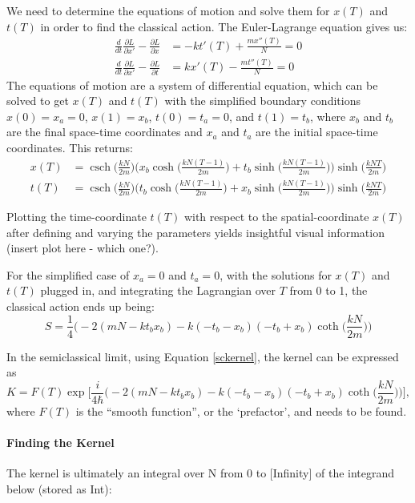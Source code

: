 \documentclass[12pt]{revtex4}
\DeclareMathOperator{\csch}{csch}
\begin{document}
We need to determine the equations of motion and solve them for $x(T)$ and $t(T)$ in order to find the classical action. The Euler-Lagrange equation gives us:
\begin{align*}
\frac{d}{dt}\frac{\partial L}{\partial x'}-\frac{\partial L}{\partial x} &= -k t'(T) + \frac{m x''(T)}{N} =0\\
\frac{d}{dt}\frac{\partial L}{\partial x'}-\frac{\partial L}{\partial t} &= k x'(T) - \frac{m t''(T)}{N} =0
\end{align*}
The equations of motion are a system of differential equation, which can be solved to get $x(T)$ and $t(T)$ with the simplified boundary conditions $x(0) = x_a = 0$, $x(1)=x_b$, $t(0) = t_a = 0$, and $t(1)=t_b$, where $x_b$ and $t_b$ are the final space-time coordinates and $x_a$ and $t_a$ are the initial space-time coordinates. This returns:
\begin{align*}
x(T) &= \csch \bigg(\frac{k N}{2 m}\bigg) \Biggr(x_b \cosh\bigg(\frac{k N (T-1)}{2m}\bigg)+ 
t_b \sinh\bigg(\frac{k N (T-1)}{2m}\bigg)\Biggr) \sinh\bigg(\frac{k N T}{2m}\bigg)\\
t(T)&= \csch \bigg(\frac{k N}{2 m}\bigg) \Biggr(t_b \cosh\bigg(\frac{k N (T-1)}{2m}\bigg)+ 
x_b \sinh\bigg(\frac{k N (T-1)}{2m}\bigg)\Biggr) \sinh\bigg(\frac{k N T}{2m}\bigg)
\end{align*} 

Plotting the time-coordinate $t(T)$ with respect to the spatial-coordinate $x(T)$ after defining and varying the parameters yields insightful visual information (insert plot here - which one?).

For the simplified case of $x_a=0$ and $t_a=0$, with the solutions for $x(T)$ and $t(T)$ plugged in, and integrating the Lagrangian over $T$ from 0 to 1, the classical action ends up being:
\begin{equation*}
S = \frac{1}{4} \Bigg(-2 (m N - k t_b x_b) - k (-t_b - x_b) (-t_b + x_b) \coth\bigg(\frac{k N}{2 m}\bigg)\Bigg)
\end{equation*} 

In the semiclassical limit, using Equation \ref{sckernel}, the kernel can be expressed as 
\[ K=F(T) \exp \Bigg[\frac{i}{4 \hbar} \Bigg(-2 (m N - k t_b x_b) - k (-t_b - x_b) (-t_b + x_b) \coth\bigg(\frac{k N}{2 m}\bigg)\Bigg)\Bigg],\]
where $F(T)$ is the ``smooth function'', or the `prefactor', and needs to be found. 

\paragraph{Finding the Kernel}
The kernel is ultimately an integral over N from 0 to [Infinity] of the integrand below (stored as Int):
\end{document}
